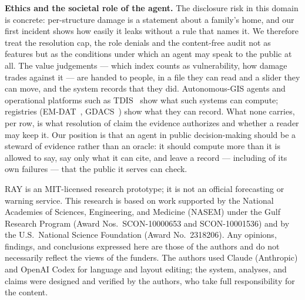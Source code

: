 \documentclass[sigconf,screen]{acmart}
\begin{document}
\textbf{Ethics and the societal role of the agent.} The disclosure risk in
this domain is concrete: per-structure damage is a statement about a
family's home, and our first incident shows how easily it leaks without a
rule that names it. We therefore treat the resolution cap, the role
denials and the content-free audit not as features but as the conditions
under which an agent may speak to the public at all. The value judgements
--- which index counts as vulnerability, how damage trades against it ---
are handed to people, in a file they can read and a slider they can move,
and the system records that they did. Autonomous-GIS agents
\cite{li2023autonomous,zhang2024geogpt} and operational platforms such as
TDIS~\cite{tdis2026} show what such systems can compute; registries
(EM-DAT~\cite{delforge2025emdat}, GDACS~\cite{gdacs2026}) show what they can
record. What none carries, per row, is what resolution of claim the
evidence authorizes and whether a reader may keep it. Our position is
that an agent in public decision-making should be a steward of evidence
rather than an oracle: it should compute more than it is allowed to say,
say only what it can cite, and leave a record --- including of its own
failures --- that the public it serves can check.

\begin{acks}
RAY is an MIT-licensed research prototype; it is not an official
forecasting or warning service. This research is based on work supported
by the National Academies of Sciences, Engineering, and Medicine (NASEM)
under the Gulf Research Program (Award Nos.\ SCON-10000653 and
SCON-10001536) and by the U.S.\ National Science Foundation (Award
No.\ 2318206). Any opinions, findings, and conclusions expressed here are
those of the authors and do not necessarily reflect the views of the
funders. The authors used Claude (Anthropic) and OpenAI Codex for language and
layout editing; the system, analyses, and claims were designed and verified by
the authors, who take full responsibility for the content.
\end{acks}



\end{document}
